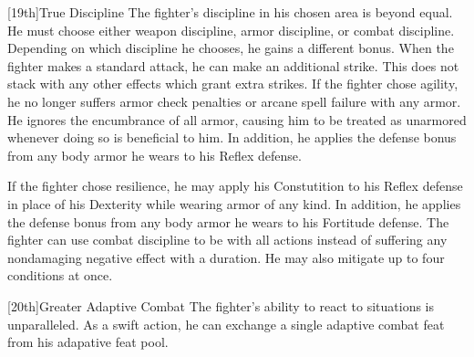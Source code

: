 [19th]{True Discipline}
The fighter's discipline in his chosen area is beyond equal.
He must choose either weapon discipline, armor discipline, or combat discipline.
Depending on which discipline he chooses, he gains a different bonus.
When the fighter makes a standard attack, he can make an additional strike.
This does not stack with any other effects which grant extra strikes.
If the fighter chose agility, he no longer suffers armor check penalties or arcane spell failure with any armor.
He ignores the encumbrance of all armor, causing him to be treated as unarmored whenever doing so is beneficial to him.
In addition, he applies the defense bonus from any body armor he wears to his Reflex defense.

If the fighter chose resilience, he may apply his Constutition to his Reflex defense in place of his Dexterity while wearing armor of any kind.
In addition, he applies the defense bonus from any body armor he wears to his Fortitude defense.
The fighter can use combat discipline to be \impaired with all actions instead of suffering any nondamaging negative effect with a duration.
He may also mitigate up to four conditions at once.

[20th]{Greater Adaptive Combat}
The fighter's ability to react to situations is unparalleled.
As a swift action, he can exchange a single adaptive combat feat from his adapative feat pool.


